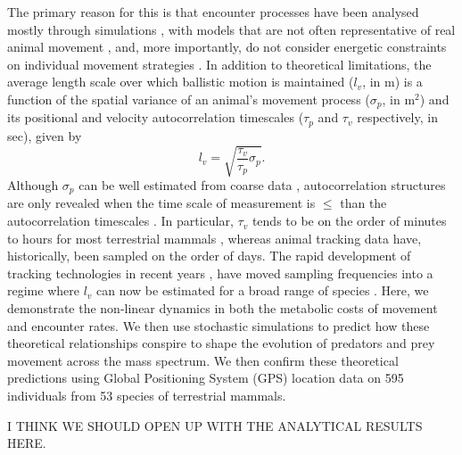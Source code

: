 \documentclass[12pt]{article}
\begin{document}
The primary reason for this is that encounter processes have been analysed mostly through simulations \cite{Bartumeus:2002,Bartumeus:2008,Gurarie:2013,Bartumeus:2014}, with models that are not often representative of real animal movement \cite{Martinez:2020}, and, more importantly, do not consider energetic constraints on individual movement strategies \cite{Kram:1990eu}. In addition to theoretical limitations, the average length scale over which ballistic motion is maintained ($l_v$, in m) is a function of the spatial variance of an animal's movement process ($\sigma_p$, in m$^2$) and its positional and velocity autocorrelation timescales ($\tau_p$ and $\tau_v$ respectively, in sec), given by
\begin{equation}
l_v = \sqrt{\frac{\tau_v}{\tau_p}\sigma_p}.
\label{eq:lv}
\end{equation}
Although $\sigma_p$ can be well estimated from coarse data \cite{Fleming:2014gd, Fleming:2014jr, pREML, AKDEvsKDE}, autocorrelation structures are only revealed when the time scale of measurement is $\leq$ than the autocorrelation timescales \cite{Fleming:2014jr,Gurarie:2017fo,Speed}. In particular, $\tau_v$ tends to be on the order of minutes to hours for most terrestrial mammals \cite{Fleming:2014jr,Gurarie:2017fo,Morato:2016ioa,Farhadinia:2018}, whereas animal tracking data have, historically, been sampled on the order of days. The rapid development of tracking technologies in recent years \cite{Kays:2015en,Hofman:2019,Nathan:2022}, have moved sampling frequencies into a regime where $l_v$ can now be estimated for a broad range of species \cite{AKDEvsKDE}. Here, we demonstrate the non-linear dynamics in both the metabolic costs of movement and encounter rates. We then use stochastic simulations to predict how these theoretical relationships conspire to shape the evolution of predators and prey movement across the mass spectrum. We then confirm these theoretical predictions using Global Positioning System (GPS) location data on 595 individuals from 53 species of terrestrial mammals.



I THINK WE SHOULD OPEN UP WITH THE ANALYTICAL RESULTS HERE.
\end{document}
